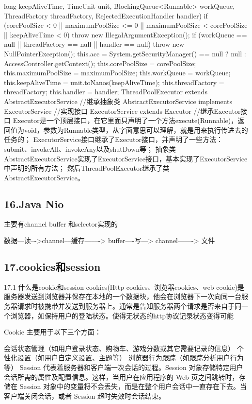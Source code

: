\documentclass[UTF8]{ctexart}
\begin{document}
                       long keepAliveTime,
                       TimeUnit unit,
                       BlockingQueue<Runnable> workQueue,
                       ThreadFactory threadFactory,
                       RejectedExecutionHandler handler) {
 if (corePoolSize < 0 ||
     maximumPoolSize <= 0 ||
     maximumPoolSize < corePoolSize ||
     keepAliveTime < 0)
     throw new IllegalArgumentException();
 if (workQueue == null || threadFactory == null || handler == null)
     throw new NullPointerException();
 this.acc = System.getSecurityManager() == null ?
         null :
         AccessController.getContext();
 this.corePoolSize = corePoolSize;
 this.maximumPoolSize = maximumPoolSize;
 this.workQueue = workQueue;
 this.keepAliveTime = unit.toNanos(keepAliveTime);
 this.threadFactory = threadFactory;
 this.handler = handler;
}
ThreadPoolExecutor extends AbstractExecutorService //继承抽象类
AbstractExecutorService implements ExecutorService //实现接口
ExecutorService extends Executor  //继承Executor接口
Executor是一个顶层接口，在它里面只声明了一个方法execute(Runnable)，返回值为void，参数为Runnable类型，从字面意思可以理解，就是用来执行传进去的任务的；
ExecutorService接口继承了Executor接口，并声明了一些方法：submit、invokeAll、invokeAny以及shutDown等；
抽象类AbstractExecutorService实现了ExecutorService接口，基本实现了ExecutorService中声明的所有方法；
然后ThreadPoolExecutor继承了类AbstractExecutorService。

\subsection{16.Java Nio}

  主要有channel buffer 和selector实现的

数据––读–->channel––缓存—––-> buffer----写---> channel––––-> 文件

\subsection{17.cookies和session}

17.1 什么是cookie和session
cookies(Http cookies、浏览器cookies、web cookie)是服务器发送到浏览器并保存在本地的一个数据块，他会在浏览器下一次向同一台服务器请求时被携带并发送到服务器上。通常是告知服务器两个请求是否来自于同一个浏览器，如保持用户的登陆状态。使得无状态的http协议记录状态变得可能

Cookie 主要用于以下三个方面：

会话状态管理（如用户登录状态、购物车、游戏分数或其它需要记录的信息）
个性化设置（如用户自定义设置、主题等）
浏览器行为跟踪（如跟踪分析用户行为等）
Session 代表着服务器和客户端一次会话的过程。Session 对象存储特定用户会话所需的属性及配置信息。这样，当用户在应用程序的 Web 页之间跳转时，存储在 Session 对象中的变量将不会丢失，而是在整个用户会话中一直存在下去。当客户端关闭会话，或者 Session 超时失效时会话结束。
\end{document}
